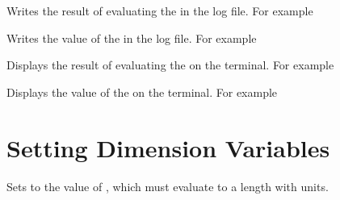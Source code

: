 \documentclass[oneside]{book}
\begin{document}
\begin{function}{\dimLog}
\begin{syntax}
 
\end{syntax}
Writes the result of evaluating the 
in the log file. For example
\begin{codehigh}
\dimLog {\lFooSomeDim+1cm}
\end{codehigh}
\end{function}

\begin{function}{\dimVarLog}
\begin{syntax}
 
\end{syntax}
Writes the value of the  in the log file. For example
\begin{codehigh}
\dimVarLog \lFooSomeDim
\end{codehigh}
\end{function}

\begin{function}{\dimShow}
\begin{syntax}
 
\end{syntax}
Displays the result of evaluating the 
on the terminal. For example
\begin{codehigh}
\dimShow {\lFooSomeDim+1cm}
\end{codehigh}
\end{function}

\begin{function}{\dimVarShow}
\begin{syntax}
 
\end{syntax}
Displays the value of the  on the terminal. For example
\begin{codehigh}
\dimVarShow \lFooSomeDim
\end{codehigh}
\end{function}

\section{Setting Dimension Variables}

\begin{function}{\dimSet}
\begin{syntax}
  
\end{syntax}
Sets  to the value of , which
must evaluate to a length with units.
\end{function}
\end{document}
